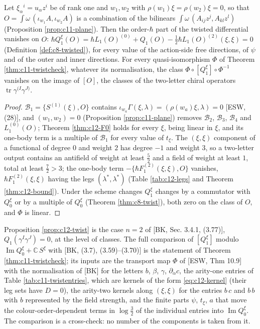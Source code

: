 \begin{proposition}
\label{prop:c12-twist}
Let $\xi_\alpha{}^i=u_\alpha z^i$ be of rank one and $w_1,w_2$ with $\rho(w_1)\xi=\rho(w_2)\xi=0$, so that $O=\int\omega\,(\iota_{w_1}A,\iota_{w_2}A)$ is a combination of the bilinears $\int\omega\,(A_{ij}z^j,A_{kl}z^l)$ (Proposition \ref{prop:c11-plane}). Then the order-$\hbar$ part of the twisted differential vanishes on $O$: $\hbar Q^\xi_1(O)=\hbar L_1(O)^{(0)}+Q_1(O)-\tfrac12\hbar L_1(O)^{(2)}(\xi,\xi)=0$ (Definition \ref{def:c8-twisted}), for every value of the action-side free directions, of $\psi$ and of the outer and inner directions. For every quasi-isomorphism $\Phi$ of Theorem \ref{thm:c11-twistcheck}, whatever its normalisation, the class $\Phi\circ[Q^\xi_1]\circ\Phi^{-1}$ vanishes on the image of $[O]$, the classes of the two-letter chiral operators $\operatorname{tr}\gamma^{(I}\gamma^{J)}$.
\end{proposition}

\begin{proof}
$\mathcal B_1=\{S^{(1)}(\xi),O\}$ contains $\iota_{w_a}\Gamma(\xi,\lambda)=(\rho(w_a)\xi,\lambda)=0$ [ESW, (28)], and $(w_1,w_2)=0$ (Proposition \ref{prop:c11-plane}) removes $\mathcal B_2$, $\mathcal B_3$, $\mathcal B_4$ and $L_1^{(0)}(O)$; Theorem \ref{thm:c12-F0} holds for every $\xi$, being linear in $\xi$, and its one-body term is a multiple of $\mathcal B_1$ for every value of $t_\xi$. The $(\xi,\xi)$ component of a functional of degree $0$ and weight $2$ has degree $-1$ and weight $3$, so a two-letter output contains an antifield of weight at least $\tfrac52$ and a field of weight at least $1$, total at least $\tfrac72>3$; the one-body term $-\{\hbar F_1^{(2)}(\xi,\xi),O\}$ vanishes, $\hbar F_1^{(2)}(\xi,\xi)$ having the legs $(\lambda^*,\lambda^*)$ (Table \ref{tab:c12-legs} and Theorem \ref{thm:c12-bound}). Under the scheme changes $Q^\xi_1$ changes by a commutator with $Q^\xi_0$ or by a multiple of $Q^\xi_0$ (Theorem \ref{thm:c8-twist}), both zero on the class of $O$, and $\Phi$ is linear.
\end{proof}

\begin{remark}
\label{rem:c12-twistcmp}
Proposition \ref{prop:c12-twist} is the case $n=2$ of [BK, Sec. 3.4.1, (3.77)], $Q_1(\gamma^I\gamma^J)=0$, at the level of classes. The full comparison of $[Q^\xi_1]$ modulo $\operatorname{Im}Q^\xi_0+\mathbb C\,S^\xi$ with [BK, (3.7), (3.59)--(3.70)] is the statement of Theorem \ref{thm:c11-twistcheck}; its inputs are the transport map $\Phi$ of [ESW, Thm 10.9] with the normalisation of [BK] for the letters $b$, $\beta$, $\gamma$, $\partial_{\dot\alpha}c$, the arity-one entries of Table \ref{tab:c11-twistentries}, which are kernels of the form \eqref{eq:c12-kernel} (their leg sets have $D=0$), the arity-two kernels along $(\xi,\xi)$ for the entries $b\,c$ and $b\,b$ with $b$ represented by the field strength, and the finite parts $\psi$, $t_\xi$, $a$ that move the colour-order-dependent terms in $\log\tfrac32$ of the individual entries into $\operatorname{Im}Q^\xi_0$. The comparison is a cross-check: no number of the components is taken from it.
\end{remark}


